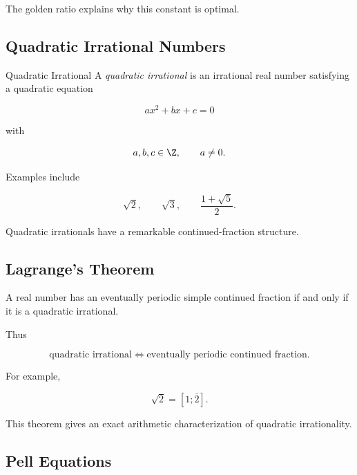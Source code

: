 The golden ratio explains why this constant is optimal.

\subsection{Quadratic Irrational Numbers}
\label{subsec:quadratic-irrationals-diophantine}

\begin{definitionbox}{Quadratic Irrational}
A \emph{quadratic irrational} is an irrational real number satisfying a
quadratic equation

\[ ax^2+bx+c=0 \]

with

\[ a,b,c\in\Z,\qquad a\neq0. \]
\end{definitionbox}

Examples include

\[ \sqrt2,\qquad\sqrt3,\qquad\frac{1+\sqrt5}{2}. \]

Quadratic irrationals have a remarkable continued-fraction structure.

\subsection{Lagrange's Theorem}
\label{subsec:lagrange-periodic-continued-fractions}

\begin{theorem}[Lagrange]
A real number has an eventually periodic simple continued fraction if and
only if it is a quadratic irrational.
\end{theorem}

Thus

\[
\boxed{
\text{quadratic irrational}
\iff
\text{eventually periodic continued fraction}.
}
\]

For example,

\[ \sqrt2=[1;\overline2]. \]

This theorem gives an exact arithmetic characterization of quadratic
irrationality.

\subsection{Pell Equations}
\label{subsec:pell-equations-diophantine-approximation}

